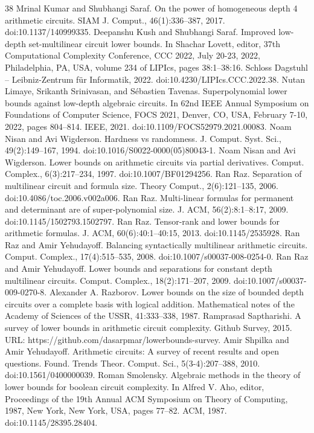 \begin{thebibliography}{38}
 Mrinal Kumar and Shubhangi Saraf. On the power of homogeneous depth 4 arithmetic circuits. SIAM J. Comput., 46(1):336–387, 2017. doi:10.1137/140999335.
 Deepanshu Kush and Shubhangi Saraf. Improved low-depth set-multilinear circuit lower bounds. In Shachar Lovett, editor, 37th Computational Complexity Conference, CCC 2022, July 20-23, 2022, Philadelphia, PA, USA, volume 234 of LIPIcs, pages 38:1–38:16. Schloss Dagstuhl – Leibniz-Zentrum für Informatik, 2022. doi:10.4230/LIPIcs.CCC.2022.38.
 Nutan Limaye, Srikanth Srinivasan, and Sébastien Tavenas. Superpolynomial lower bounds against low-depth algebraic circuits. In 62nd IEEE Annual Symposium on Foundations of Computer Science, FOCS 2021, Denver, CO, USA, February 7-10, 2022, pages 804–814. IEEE, 2021. doi:10.1109/FOCS52979.2021.00083.
 Noam Nisan and Avi Wigderson. Hardness vs randomness. J. Comput. Syst. Sci., 49(2):149–167, 1994. doi:10.1016/S0022-0000(05)80043-1.
 Noam Nisan and Avi Wigderson. Lower bounds on arithmetic circuits via partial derivatives. Comput. Complex., 6(3):217–234, 1997. doi:10.1007/BF01294256.
 Ran Raz. Separation of multilinear circuit and formula size. Theory Comput., 2(6):121–135, 2006. doi:10.4086/toc.2006.v002a006.
 Ran Raz. Multi-linear formulas for permanent and determinant are of super-polynomial size. J. ACM, 56(2):8:1–8:17, 2009. doi:10.1145/1502793.1502797.
 Ran Raz. Tensor-rank and lower bounds for arithmetic formulas. J. ACM, 60(6):40:1–40:15, 2013. doi:10.1145/2535928.
 Ran Raz and Amir Yehudayoff. Balancing syntactically multilinear arithmetic circuits. Comput. Complex., 17(4):515–535, 2008. doi:10.1007/s00037-008-0254-0.
 Ran Raz and Amir Yehudayoff. Lower bounds and separations for constant depth multilinear circuits. Comput. Complex., 18(2):171–207, 2009. doi:10.1007/s00037-009-0270-8.
 Alexander A. Razborov. Lower bounds on the size of bounded depth circuits over a complete basis with logical addition. Mathematical notes of the Academy of Sciences of the USSR, 41:333–338, 1987.
 Ramprasad Saptharishi. A survey of lower bounds in arithmetic circuit complexity. Github Survey, 2015. URL: https://github.com/dasarpmar/lowerbounds-survey.
 Amir Shpilka and Amir Yehudayoff. Arithmetic circuits: A survey of recent results and open questions. Found. Trends Theor. Comput. Sci., 5(3-4):207–388, 2010. doi:10.1561/0400000039.
 Roman Smolensky. Algebraic methods in the theory of lower bounds for boolean circuit complexity. In Alfred V. Aho, editor, Proceedings of the 19th Annual ACM Symposium on Theory of Computing, 1987, New York, New York, USA, pages 77–82. ACM, 1987. doi:10.1145/28395.28404.

\end{thebibliography}
